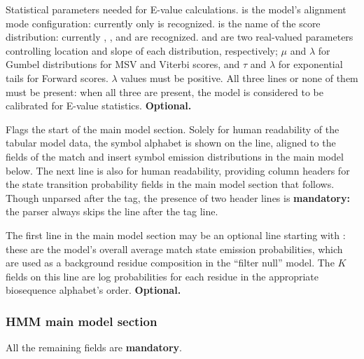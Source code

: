 \begin{sreitems}{}
\item [\emprog{STATS <s1> <s2> <f1> <f2>}] Statistical parameters
  needed for E-value calculations.  is the model's
  alignment mode configuration: currently only  is
  recognized.  is the name of the score distribution:
  currently , , and  are
  recognized.   and  are two real-valued
  parameters controlling location and slope of each distribution,
  respectively; $\mu$ and $\lambda$ for Gumbel distributions for MSV
  and Viterbi scores, and $\tau$ and $\lambda$ for exponential tails
  for Forward scores.  $\lambda$ values must be positive.  All three
  lines or none of them must be present: when all three are present,
  the model is considered to be calibrated for E-value
  statistics. \textbf{Optional.}

\item [\emprog{HMM }] Flags the start of the main model
section. Solely for human readability of the tabular model data, the
symbol alphabet is shown on the  line, aligned to the fields
of the match and insert symbol emission distributions in the main
model below. The next line is also for human readability, providing
column headers for the state transition probability fields in the main
model section that follows. Though unparsed after the  tag,
the presence of two header lines is \textbf{mandatory:} the parser
always skips the line after the  tag line.

\item [\emprog{COMPO <f>*K}] The first line in the main model section
may be an optional line starting with : these are the
model's overall average match state emission probabilities, which are
used as a background residue composition in the ``filter null''
model. The $K$ fields on this line are log probabilities for each
residue in the appropriate biosequence alphabet's
order. \textbf{Optional.}

\end{sreitems}

\subsubsection{HMM main model section}

All the remaining fields are \textbf{mandatory}.

